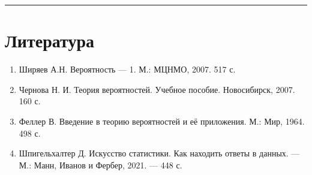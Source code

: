 \documentclass[11pt,a4paper]{article}
\renewcommand{\linethickness}{0.1ex}
\providecommand{\tightlist}{%
      \setlength{\itemsep}{0pt}\setlength{\parskip}{0pt}}
\begin{document}
    \begin{center}\rule{0.5\linewidth}{\linethickness}\end{center}

    \hypertarget{ux43bux438ux442ux435ux440ux430ux442ux443ux440ux430}{%
\section{Литература}\label{ux43bux438ux442ux435ux440ux430ux442ux443ux440ux430}}

\begin{enumerate}
\def\labelenumi{\arabic{enumi}.}
\tightlist
\item
  Ширяев А.Н. Вероятность --- 1. М.: МЦНМО, 2007. 517 с.
\item
  Чернова Н. И. Теория вероятностей. Учебное пособие. Новосибирск, 2007.
  160 с.
\item
  Феллер В. Введение в теорию вероятностей и её приложения. М.: Мир,
  1964. 498 с.
\item
  Шпигельхалтер Д. Искусство статистики. Как находить ответы в данных.
  --- М.: Манн, Иванов и Фербер, 2021. --- 448 с.
\end{enumerate}


    
    
    
\end{document}
